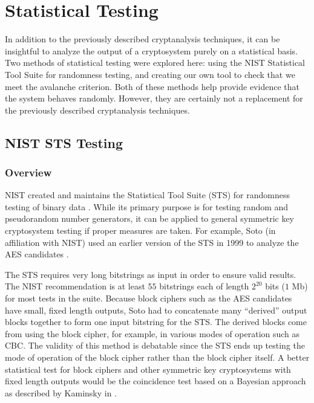 \chapter{Statistical Testing}
\label{ch:StatisticalTesting}
In addition to the previously described cryptanalysis techniques, it can be insightful to analyze the output of a cryptosystem purely on a statistical basis.
Two methods of statistical testing were explored here: using the NIST Statistical Tool Suite for randomness testing, and creating our own tool to check that we meet the avalanche criterion.
Both of these methods help provide evidence that the system behaves randomly.
However, they are certainly not a replacement for the previously described cryptanalysis techniques.

\section{NIST STS Testing}
\subsection{Overview}
NIST created and maintains the Statistical Tool Suite (STS) for randomness testing of binary data \cite{NIST2010_STS}.
While its primary purpose is for testing random and pseudorandom number generators, it can be applied to general symmetric key cryptosystem testing if proper measures are taken.
For example, Soto (in affiliation with NIST) used an earlier version of the STS in 1999 to analyze the AES candidates \cite{NIST1999_AES_STS_Testing}.

The STS requires very long bitstrings as input in order to ensure valid results. 
The NIST recommendation is at least $55$ bitstrings each of length $2^{20}$ bits ($1$ Mb) for most tests in the suite.
Because block ciphers such as the AES candidates have small, fixed length outputs, Soto had to concatenate many ``derived'' output blocks together to form one input bitstring for the STS.
The derived blocks come from using the block cipher, for example, in various modes of operation such as CBC.
The validity of this method is debatable since the STS ends up testing the mode of operation of the block cipher rather than the block cipher itself.
A better statistical test for block ciphers and other symmetric key cryptosystems with fixed length outputs would be the coincidence test based on a Bayesian approach as described by Kaminsky in \cite{Kaminsky2013_CoincidenceTest}.


